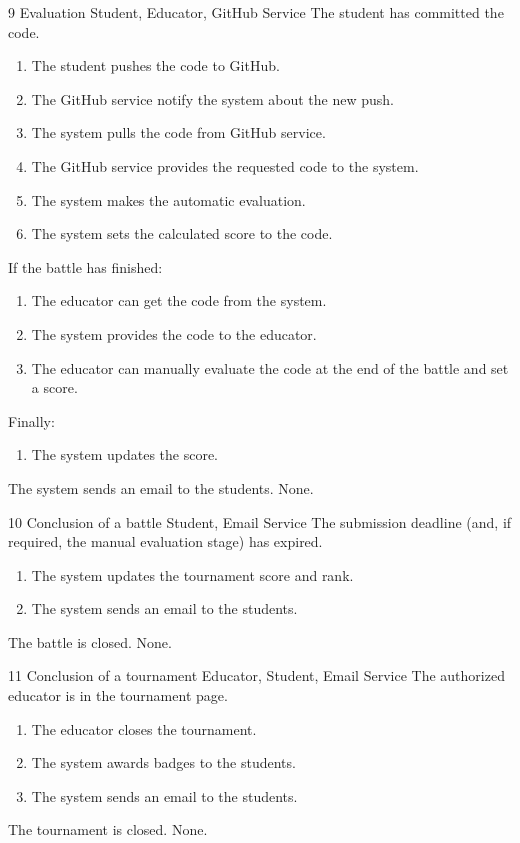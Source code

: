 \usecase
{9}
{Evaluation} %
{Student, Educator, GitHub Service} %
{The student has committed the code.} %
{ %
    \begin{enumerate}
        \item The student pushes the code to GitHub.
        \item The GitHub service notify the system about the new push.
        \item The system pulls the code from GitHub service.
        \item The GitHub service provides the requested code to the system.
        \item The system makes the automatic evaluation.
        \item The system sets the calculated score to the code.
    \end{enumerate}
    If the battle has finished: 
    \begin{enumerate} [resume]
        \item The educator can get the code from the system.
        \item The system provides the code to the educator.
        \item The educator can manually evaluate the code at the end of the battle and set a score.
    \end{enumerate}
    Finally: 
    \begin{enumerate} [resume]
        \item The system updates the score.
    \end{enumerate}
}
{The system sends an email to the students.} %
{ %
 None. 
}
{ %
}
\clearpage

\usecase
{10}
{Conclusion of a battle}
{Student, Email Service}
{The submission deadline (and, if required, the manual evaluation stage) has expired.}
{
    \begin{enumerate}
        \item The system updates the tournament score and rank.
        \item The system sends an email to the students.
    \end{enumerate}
}
{The battle is closed.}
{
    None.
}
{}


\usecase
{11}
{Conclusion of a tournament}
{Educator, Student, Email Service}
{The authorized educator is in the tournament page.}
{
    \begin{enumerate}
        \item The educator closes the tournament.
        \item The system awards badges to the students.
        \item The system sends an email to the students.
    \end{enumerate}
}
{The tournament is closed.}
{
    None.
}
{}

